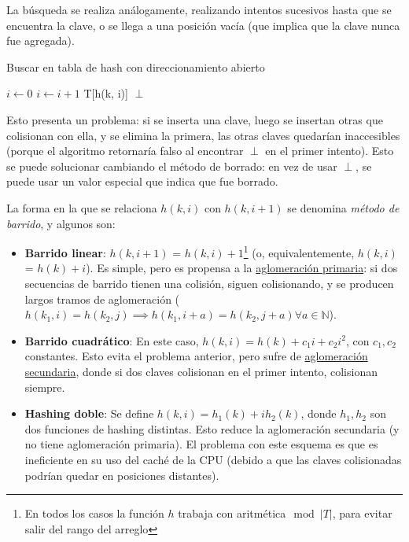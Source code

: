 \documentclass{article}
\begin{document}
La búsqueda se realiza análogamente, realizando intentos sucesivos hasta que se encuentra la clave, o se llega a una posición vacía (que implica que la clave nunca fue agregada).
\begin{algorithm}[H]
    \caption*{Buscar en tabla de hash con direccionamiento abierto}
    \begin{algorithmic}
        \State $i \gets 0$
        \State $i \gets i + 1$
        \EndWhile
        \State \Return T[h(k, i)]
        \Else
        \State \Return $\perp$
        \EndIf
        \EndFunction
    \end{algorithmic}
\end{algorithm}

Esto presenta un problema: si se inserta una clave, luego se insertan otras que colisionan con ella, y se elimina la primera, las otras claves quedarían inaccesibles (porque el algoritmo retornaría falso al encontrar $\perp$ en el primer intento). Esto se puede solucionar cambiando el método de borrado: en vez de usar $\perp$, se puede usar un valor especial que indica que fue borrado.

La forma en la que se relaciona $h(k, i)$ con $h(k, i + 1)$ se denomina \textit{método de barrido}, y algunos son:
\begin{itemize}
    \item \textbf{Barrido linear}: $h(k, i + 1)$ = $h(k, i) + 1$\footnote{En todos los casos la función $h$ trabaja con aritmética$\mod{|T|}$, para evitar salir del rango del arreglo} (o, equivalentemente, $h(k, i)$ = $h(k) + i$). Es simple, pero es propensa a la \underline{aglomeración primaria}: si dos secuencias de barrido tienen una colisión, siguen colisionando, y se producen largos tramos de aglomeración ($h(k_1, i) = h(k_2, j) \implies h(k_1, i + a) = h(k_2, j + a) \forall a \in \mathbb{N}$).
    \item \textbf{Barrido cuadrático}: En este caso, $h(k, i) = h(k) + c_1 i + c_2 i^2$, con $c_1, c_2$ constantes. Esto evita el problema anterior, pero sufre de \underline{aglomeración secundaria}, donde si dos claves colisionan en el primer intento, colisionan siempre.
    \item \textbf{Hashing doble}: Se define $h(k, i) = h_1(k) + i h_2(k)$, donde $h_1, h_2$ son dos funciones de hashing distintas. Esto reduce la aglomeración secundaria (y no tiene aglomeración primaria). El problema con este esquema es que es ineficiente en su uso del caché de la CPU (debido a que las claves colisionadas podrían quedar en posiciones distantes).
\end{itemize}
\end{document}
